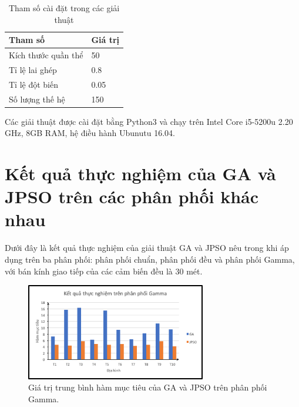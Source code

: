 \documentclass{hust}
\begin{document}
\begin{table}[H]
	\caption{Tham số cài đặt trong các giải thuật}\label{tab:2}
	\centering
	\begin{tabularx}{0.6\textwidth} {X l}
		\hline
		\textbf{Tham số}              & \textbf{Giá trị}    \\ \hline
		Kích thước quần thể    & 50  \\ 
		Tỉ lệ lai ghép & 0.8    \\
		Tỉ lệ đột biến & 0.05        \\                
		Số lượng thế hệ & 150 \\     \hline  
	\end{tabularx}
\end{table}

Các giải thuật được cài đặt bằng Python3 và chạy trên Intel Core i5-5200u 2.20 GHz, 8GB RAM, hệ điều hành Ubunutu 16.04.

\section{Kết quả thực nghiệm của \gls{GA} và \gls{JPSO} trên các phân phối khác nhau}
Dưới đây là kết quả thực nghiệm của giải thuật \gls{GA} và \gls{JPSO} nêu trong \cite{lu2014construction} khi áp dụng trên ba phân phối: phân phối chuẩn, phân phối đều và phân phối Gamma, với bán kính giao tiếp của các cảm biến đều là 30 mét.



\begin{figure}[H]
	\centering
	\includegraphics[width=0.7\textwidth]{images/medium_gamma.png}
	\caption{Giá trị trung bình hàm mục tiêu của \gls{GA} và \gls{JPSO} trên phân phối Gamma.} \label{fig:medium_gamma}
\end{figure}
\end{document}
